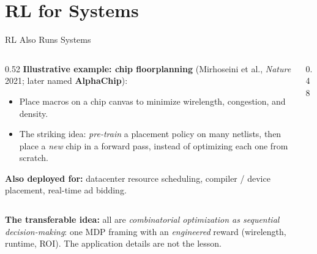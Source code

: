 \section{RL for Systems}

\begin{frame}{RL Also Runs Systems}
\begin{columns}[T]
\begin{column}{0.52\textwidth}
\footnotesize
\textbf{Illustrative example: chip floorplanning} (Mirhoseini et al.,
\emph{Nature} 2021; later named \textbf{AlphaChip}):
\begin{itemize}\itemsep0.25em
    \item Place macros on a chip canvas to minimize wirelength, congestion,
          and density.
    \item The striking idea: \emph{pre-train} a placement policy on many
          netlists, then place a \emph{new} chip in a forward pass, instead
          of optimizing each one from scratch.
\end{itemize}
\vspace{0.4em}
\textbf{Also deployed for:} datacenter resource scheduling, compiler / device
placement, real-time ad bidding.
\end{column}
\begin{column}{0.48\textwidth}
\centering
{}
\end{column}
\end{columns}
\vfill
\begin{center}
\setlength{\fboxsep}{5pt}%
\colorbox{boxgreen!50}{\parbox{0.94\textwidth}{\centering\footnotesize
\textbf{The transferable idea:} all are \emph{combinatorial optimization as
sequential decision-making}: one MDP framing with an \emph{engineered} reward
(wirelength, runtime, ROI). The application details are not the lesson.}}
\end{center}
\end{frame}
